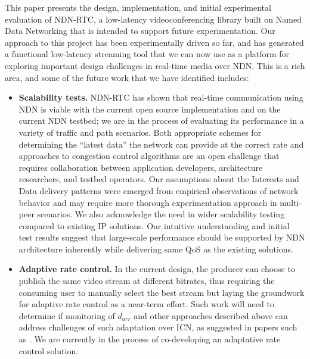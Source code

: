 \documentclass{icn/sig-alternate-2013} %
\newcommand{\ndnrtcName}{NDN-RTC} %
\begin{document}
This paper presents the design, implementation, and initial experimental evaluation of \ndnrtcName{}, a low-latency videoconferencing library built on Named Data Networking that is intended to support future experimentation.   Our approach to this project has been experimentally driven so far, and has generated a functional low-latency streaming tool that we can now use as a platform for exploring important design challenges in real-time media over NDN.  This is a rich area, and some of the future work that we have identified includes: 
\begin{itemize}[label={}]

\item \textbf{Scalability tests.} \ndnrtcName{} has shown that real-time communication using NDN is viable with the current open source implementation and on the current NDN testbed;  we are in the process of evaluating its performance in a variety of traffic and path scenarios. Both appropriate schemes for determining the ``latest data'' the network can provide at the correct rate and approaches to congestion control algorithms are an open challenge that requires collaboration between application developers,  architecture researchers, and testbed operators. Our assumptions about the Interests and Data delivery patterns were emerged from empirical observations of network behavior and may require more thorough experimentation approach in multi-peer scenarios. We also acknowledge the need in wider scalability testing compared to existing IP solutions. Our intuitive understanding and initial test results suggest that large-scale performance should be supported by NDN architecture inherently while delivering same QoS as the existing solutions.

\item \textbf{Adaptive rate control.} In the current design, the producer can choose to publish the same video stream at different bitrates, thus requiring the consuming user to manually select the best stream but laying the groundwork for adaptive rate control as a near-term effort. Such work will need to determine if monitoring of $d_{arr}$ and other approaches described above can address challenges of such adaptation over ICN, as suggested in papers such as \cite{posch2014client}.  We are currently in the process of co-developing an adaptative rate control solution. 



\end{itemize}
\end{document}
